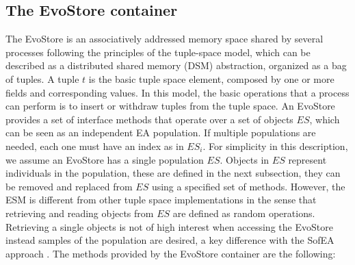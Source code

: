 \subsection{The EvoStore container}
\label{sss:container}
The EvoStore is an associatively addressed memory space shared by several processes following the principles of the tuple-space model, which can be described as a distributed shared memory (DSM) abstraction, organized as a bag of tuples.
A tuple $t$ is the basic tuple space element, composed by one or more fields and corresponding values. In this model, the basic operations that a process can perform is to insert or withdraw tuples from the tuple space. %
An EvoStore provides a set of interface methods that operate over a set of objects $ES$, which can be seen as an independent EA population. If multiple populations are needed, each one must have an index as in $ES_i$. For simplicity in this description, we assume an EvoStore has a single population $ES$. Objects in $ES$ represent individuals in the population, these are defined in the next subsection, they can be removed and replaced from $ES$ using a specified set of methods. However, the ESM is different from other tuple space implementations in the sense that retrieving and reading objects from $ES$ are defined as random operations. Retrieving a single objects is not of high interest when accessing the
EvoStore instead samples of the population are desired, a key difference with the SofEA approach \cite{sofea1,sofea2,sofea3}.
The methods provided by the EvoStore container are the following:

